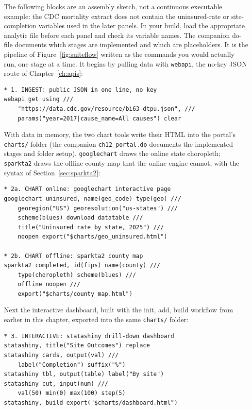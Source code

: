 The following blocks are an assembly sketch, not a continuous executable example: the CDC mortality extract does not contain the uninsured-rate or site-completion variables used in the later panels. In your build, load the appropriate analytic file before each panel and check its variable names. The companion do-file documents which stages are implemented and which are placeholders. It is the pipeline of Figure~\ref{fig:suiteflow} written as the commands you would actually run, one stage at a time. It begins by pulling data with \texttt{webapi}, the no-key JSON route of Chapter~\ref{ch:apis}:
\par
{\footnotesize
\begin{verbatim}
* 1. INGEST: public JSON in one line, no key
webapi get using ///
    "https://data.cdc.gov/resource/bi63-dtpu.json", ///
    params("year=2017|cause_name=All causes") clear
\end{verbatim}
}
With data in memory, the two chart tools write their HTML into the portal's \texttt{charts/} folder (the companion \texttt{ch12\_portal.do} documents the implemented stages and folder setup). \texttt{googlechart} draws the online state choropleth; \texttt{sparkta2} draws the offline county map that the online engine cannot, with the syntax of Section~\ref{sec:sparkta2}:
\par
{\footnotesize
\begin{verbatim}
* 2a. CHART online: googlechart interactive page
googlechart uninsured, name(geo_code) type(geo) ///
    georegion("US") georesolution("us-states") ///
    scheme(blues) download datatable ///
    title("Uninsured rate by state, 2025") ///
    noopen export("$charts/geo_uninsured.html")

* 2b. CHART offline: sparkta2 county map
sparkta2 completed, id(fips) name(county) ///
    type(choropleth) scheme(blues) ///
    offline noopen ///
    export("$charts/county_map.html")
\end{verbatim}
}
Next the interactive dashboard, built with the init, add, build workflow from earlier in this chapter, exported into the same \texttt{charts/} folder:
\par
{\footnotesize
\begin{verbatim}
* 3. INTERACTIVE: statashiny drill-down dashboard
statashiny, title("Site Outcomes") replace
statashiny cards, output(val) ///
    label("Completion") suffix("%")
statashiny tbl, output(table) label("By site")
statashiny cut, input(num) ///
    val(50) min(0) max(100) step(5)
statashiny, build export("$charts/dashboard.html")
\end{verbatim}
}

